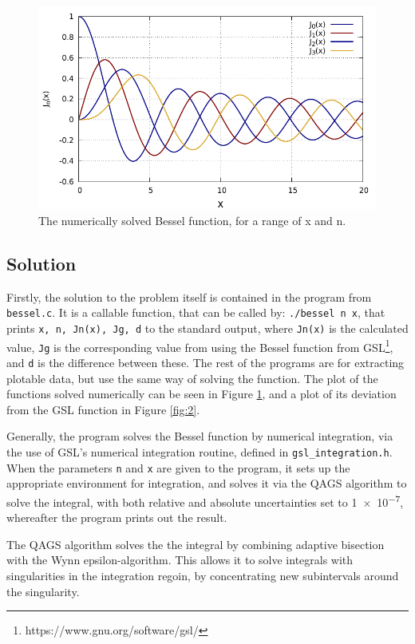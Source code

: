 \documentclass[twocolumn]{article}
\begin{document}
\begin{figure}[ht]
	\centering
	\includegraphics[width=\linewidth]{fig.pdf}
	\caption{The numerically solved Bessel function, for a range of x and n.}
	\label{fig:1}
\end{figure}


\subsection*{Solution}
Firstly, the solution to the problem itself is contained in the program from \texttt{bessel.c}. It is a callable function, that can be called by: \texttt{./bessel n x}, that prints \texttt{x, n, Jn(x), Jg, d} to the standard output, where \texttt{Jn(x)} is the calculated value, \texttt{Jg} is the corresponding value from using the Bessel function from GSL\footnote{https://www.gnu.org/software/gsl/}, and \texttt{d} is the difference between these. The rest of the programs are for extracting plotable data, but use the same way of solving the function. The plot of the functions solved numerically can be seen in Figure \ref{fig:1}, and a plot of its deviation from the GSL function in Figure \ref{fig:2}.

Generally, the program solves the Bessel function by numerical integration, via the use of GSL's numerical integration routine, defined in \texttt{gsl\_integration.h}. When the parameters \texttt{n} and \texttt{x} are given to the program, it sets up the appropriate environment for integration, and solves it via the QAGS algorithm to solve the integral, with both relative and absolute uncertainties set to \num{1e-7}, whereafter the program prints out the result.

The QAGS algorithm solves the the integral by combining adaptive bisection with the Wynn epsilon-algorithm. This allows it to solve integrals with singularities in the integration regoin, by concentrating new subintervals around the singularity. 
\end{document}
